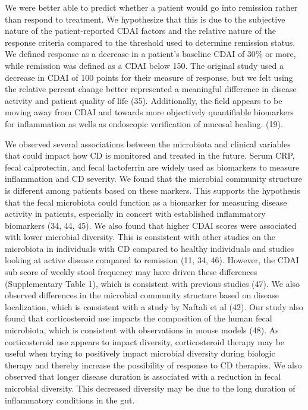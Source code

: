 \documentclass[12pt,]{article}
\begin{document}
We were better able to predict whether a patient would go into remission
rather than respond to treatment. We hypothesize that this is due to the
subjective nature of the patient-reported CDAI factors and the relative
nature of the response criteria compared to the threshold used to
determine remission status. We defined response as a decrease in a
patient's baseline CDAI of 30\% or more, while remission was defined as
a CDAI below 150. The original study used a decrease in CDAI of 100
points for their measure of response, but we felt using the relative
percent change better represented a meaningful difference in disease
activity and patient quality of life (35). Additionally, the field
appears to be moving away from CDAI and towards more objectively
quantifiable biomarkers for inflammation as wells as endoscopic
verification of mucosal healing. (19).

We observed several associations between the microbiota and clinical
variables that could impact how CD is monitored and treated in the
future. Serum CRP, fecal calprotectin, and fecal lactoferrin are widely
used as biomarkers to measure inflammation and CD severity. We found
that the microbial community structure is different among patients based
on these markers. This supports the hypothesis that the fecal microbiota
could function as a biomarker for measuring disease activity in
patients, especially in concert with established inflammatory biomarkers
(34, 44, 45). We also found that higher CDAI scores were associated with
lower microbial diversity. This is consistent with other studies on the
microbiota in individuals with CD compared to healthy individuals and
studies looking at active disease compared to remission (11, 34, 46).
However, the CDAI sub score of weekly stool frequency may have driven
these differences (Supplementary Table 1), which is consistent with
previous studies (47). We also observed differences in the microbial
community structure based on disease localization, which is consistent
with a study by Naftali et al (42). Our study also found that
corticosteroid use impacts the composition of the human fecal
microbiota, which is consistent with observations in mouse models (48).
As corticosteroid use appears to impact diversity, corticosteroid
therapy may be useful when trying to positively impact microbial
diversity during biologic therapy and thereby increase the possibility
of response to CD therapies. We also observed that longer disease
duration is associated with a reduction in fecal microbial diversity.
This decreased diversity may be due to the long duration of inflammatory
conditions in the gut.
\end{document}
